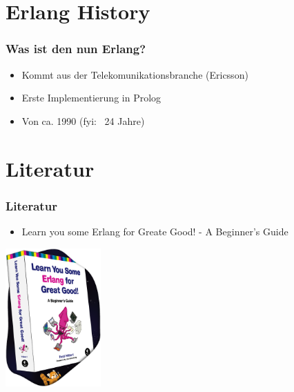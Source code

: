 \documentclass{beamer}
\begin{document}
\section{Erlang History}
\begin{frame} %
  \frametitle{Was ist den nun Erlang?} %
  \begin{itemize} %
    \item Kommt aus der Telekomunikationsbranche (Ericsson)
    \item Erste Implementierung in Prolog
    \item Von ca. 1990 (fyi: ~24 Jahre)
  \end{itemize}
\end{frame}

\section{Literatur}
\begin{frame} %
  \frametitle{Literatur} %
  \begin{itemize} %
    \item Learn you some Erlang for Greate Good! - A Beginner's Guide
  \end{itemize}
  \includegraphics[height=200px]{img/splash-book}
\end{frame}
\end{document}
